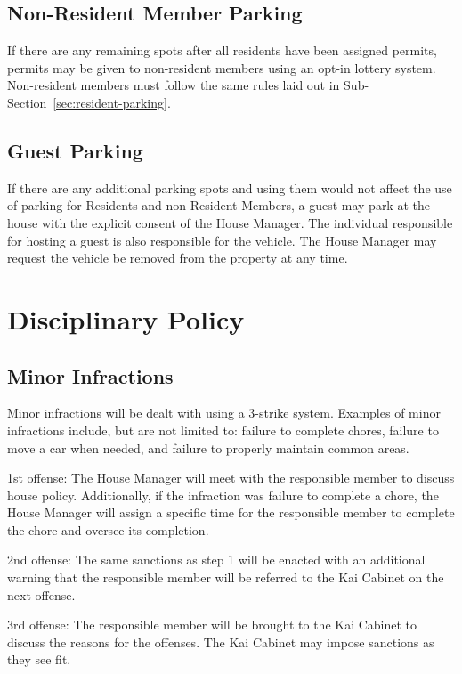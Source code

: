 \subsection{Non-Resident Member Parking}

If there are any remaining spots after all residents have been assigned
permits, permits may be given to non-resident members using an opt-in lottery
system.
Non-resident members must follow the same rules laid out in
Sub-Section~\ref{sec:resident-parking}.

\subsection{Guest Parking}

If there are any additional parking spots and using them would not affect the
use of parking for Residents and non-Resident Members, a guest may park at the
house with the explicit consent of the House Manager.
The individual responsible for hosting a guest is also responsible for the
vehicle.
The House Manager may request the vehicle be removed from the property at any
time.

\section{Disciplinary Policy}

\subsection{Minor Infractions}

Minor infractions will be dealt with using a 3-strike system.
Examples of minor infractions include, but are not limited to: failure to
complete chores, failure to move a car when needed, and failure to properly
maintain common areas.

1st offense: The House Manager will meet with the responsible member to discuss
house policy.
Additionally, if the infraction was failure to complete a chore, the House
Manager will assign a specific time for the responsible member to complete the
chore and oversee its completion.

2nd offense: The same sanctions as step 1 will be enacted with an additional
warning that the responsible member will be referred to the Kai Cabinet on the
next offense.

3rd offense: The responsible member will be brought to the Kai Cabinet to
discuss the reasons for the offenses.
The Kai Cabinet may impose sanctions as they see fit.

